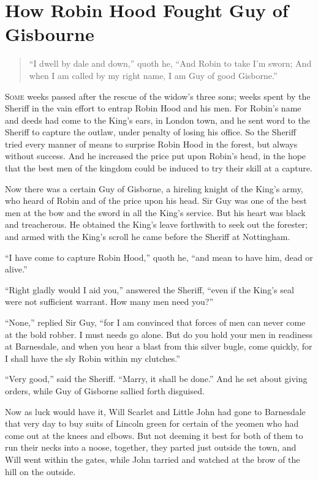 \chapter{How Robin Hood Fought Guy of Gisbourne}

\begin{quote}
“I dwell by dale and down,” quoth he,
“And Robin to take I’m sworn;
And when I am called by my right name,
I am Guy of good Gisborne.”
\end{quote}

\lettrine{S}{ome} weeks passed after the rescue of the widow's three sons; weeks
spent by the Sheriff in the vain effort to entrap Robin Hood and his
men. For Robin's name and deeds had come to the King's ears, in London
town, and he sent word to the Sheriff to capture the outlaw, under
penalty of losing his office. So the Sheriff tried every manner of means
to surprise Robin Hood in the forest, but always without success. And he
increased the price put upon Robin's head, in the hope that the best men
of the kingdom could be induced to try their skill at a capture.

Now there was a certain Guy of Gisborne, a hireling knight of the King's
army, who heard of Robin and of the price upon his head. Sir Guy was one
of the best men at the bow and the sword in all the King's service. But
his heart was black and treacherous. He obtained the King's leave
forthwith to seek out the forester; and armed with the King's scroll he
came before the Sheriff at Nottingham.

``I have come to capture Robin Hood,'' quoth he, ``and mean to have him,
dead or alive.''

``Right gladly would I aid you,'' answered the Sheriff, ``even if the
King's seal were not sufficient warrant. How many men need you?''

``None,'' replied Sir Guy, ``for I am convinced that forces of men can
never come at the bold robber. I must needs go alone. But do you hold
your men in readiness at Barnesdale, and when you hear a blast from this
silver bugle, come quickly, for I shall have the sly Robin within my
clutches.''

``Very good,'' said the Sheriff. ``Marry, it shall be done.'' And he set
about giving orders, while Guy of Gisborne sallied forth disguised.

Now as luck would have it, Will Scarlet and Little John had gone to
Barnesdale that very day to buy suits of Lincoln green for certain of
the yeomen who had come out at the knees and elbows. But not deeming it
best for both of them to run their necks into a noose, together, they
parted just outside the town, and Will went within the gates, while John
tarried and watched at the brow of the hill on the outside.

